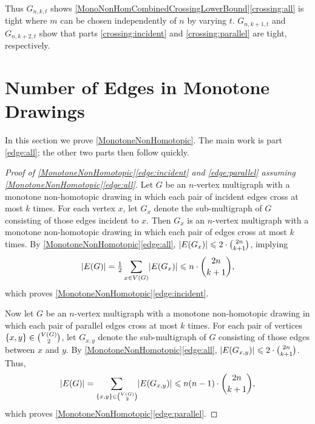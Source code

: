 \documentclass[a4paper,11pt]{article}
\renewcommand{\leq}{\leqslant}
\DeclarePairedDelimiter{\abs}{\lvert}{\rvert} %
\DeclarePairedDelimiter{\set}{\lbrace}{\rbrace} %
\begin{document}
Thus $G_{n, k, t}$ shows \cref{MonoNonHomCombinedCrossingLowerBound}\ref{crossing:all} is tight where $m$ can be chosen independently of $n$ by varying $t$. $G_{n, k + 1, t}$ and $G_{n, k + 2, t}$ show that parts \ref{crossing:incident} and \ref{crossing:parallel} are tight, respectively.

\section{Number of Edges in Monotone Drawings}\label{sec:mono}

In this section we prove \cref{MonotoneNonHomotopic}. The main work is part \ref{edge:all}; the other two parts then follow quickly.

\begin{proof}[Proof of \cref{MonotoneNonHomotopic}\ref{edge:incident} and \ref{edge:parallel} assuming \cref{MonotoneNonHomotopic}\ref{edge:all}]
    Let $G$ be an $n$-vertex multigraph with a monotone non-homotopic drawing in which each pair of incident edges cross at most $k$ times. For each vertex $x$, let $G_x$ denote the sub-multigraph of $G$ consisting of those edges incident to $x$. Then $G_x$ is an $n$-vertex multigraph with a monotone non-homotopic drawing in which each pair of edges cross at most $k$ times. By \cref{MonotoneNonHomotopic}\ref{edge:all}, $\abs{E(G_x)} \leq 2 \cdot \binom{2n}{k + 1}$, implying 
    \begin{equation*}
        \abs{E(G)} = \tfrac{1}{2} \sum_{x \in V(G)} \abs{E(G_x)} \leq n \cdot \binom{2n}{k + 1},
    \end{equation*}
    which proves \cref{MonotoneNonHomotopic}\ref{edge:incident}.

    Now let $G$ be an $n$-vertex multigraph with a monotone non-homotopic drawing in which each pair of parallel edges cross at most $k$ times. For each pair of vertices $\set{x, y} \in \binom{V(G)}{2}$, let $G_{x, y}$ denote the sub-multigraph of $G$ consisting of those edges between $x$ and $y$. By \cref{MonotoneNonHomotopic}\ref{edge:all}, $\abs{E(G_{x, y})} \leq 2 \cdot \binom{2n}{k + 1}$. Thus,
    \begin{equation*}
        \abs{E(G)} = \sum_{\set{x, y} \in \binom{V(G)}{2}} \abs{E(G_{x, y})} \leq n (n - 1) \cdot \binom{2n}{k + 1},
    \end{equation*}
    which proves \cref{MonotoneNonHomotopic}\ref{edge:parallel}.
\end{proof}
\end{document}
